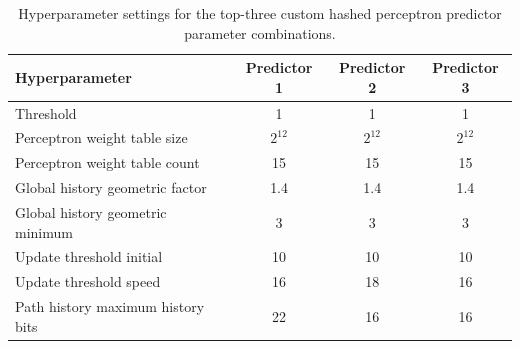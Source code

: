 \documentclass{article}
\begin{document}
\begin{table}[h]
    \centering
    \begin{tabular}{lccc}
        \toprule
        \textbf{Hyperparameter} & \textbf{Predictor 1} & \textbf{Predictor 2} & \textbf{Predictor 3} \\
        \midrule
        Threshold                        & 1 & 1 & 1 \\
        Perceptron weight table size      & $2^{12}$ & $2^{12}$ & $2^{12}$ \\
        Perceptron weight table count                     & 15 & 15 & 15 \\
        Global history geometric factor   & 1.4 & 1.4 & 1.4 \\
        Global history geometric minimum    & 3 & 3 & 3 \\
        Update threshold initial          & 10 & 10 & 10 \\
        Update threshold speed            & 16 & 18 & 16 \\        
        Path history maximum history bits  & 22 & 16 & 16 \\
        \bottomrule
    \end{tabular}
    \caption{Hyperparameter settings for the top-three custom hashed perceptron predictor parameter combinations.}
    \label{tab:custom_res_desc}
\end{table}
\end{document}
